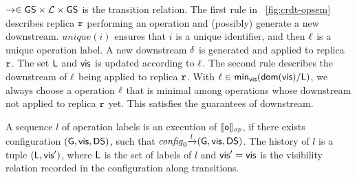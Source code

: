 $\rightarrow \in \mathsf{GS} \times \mathcal{L} \times \mathsf{GS}$ is the transition relation. The first rule in \figurename~\ref{fig:crdt-opsem} describes replica $\mathtt{r}$ performing an operation and (possibly) generate a new downstream. $\mathit{unique}(i)$ ensures that $i$ is a unique identifier, and then $\ell$ is a unique operation label. A new downstream $\delta$ is generated and applied to replica $\mathtt{r}$. The set $\mathsf{L}$ and $\mathsf{vis}$ is updated according to $\ell$. The second rule describes the downstream of $\ell$ being applied to replica $\mathtt{r}$. With $\ell \in \mathsf{min}_{\mathsf{vis}}(\mathsf{dom}(\mathsf{vis}) / \mathsf{L})$, we always choose a operation $\ell$ that is minimal among operations whose downstream not applied to replica $\mathtt{r}$ yet. This satisfies the guarantees of downstream.


A sequence $l$ of operation labels is an execution of $\llbracket \mathtt{o} \rrbracket_{\mathit{op}}$, if there exists configuration $(\mathsf{G}, \mathsf{vis}, \mathsf{DS})$, such that $\mathit{config}_0 {\xrightarrow{ l }} (\mathsf{G}, \mathsf{vis}, \mathsf{DS})$. The history of $l$ is a tuple $(\mathsf{L}, \mathsf{vis}')$, where $\mathsf{L}$ is the set of labels of $l$ and $\mathsf{vis}' = \mathsf{vis}$ is the visibility relation recorded in the configuration along transitions.







